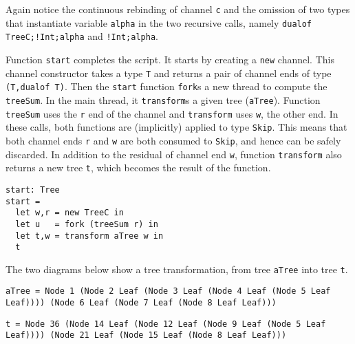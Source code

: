 Again notice the continuous rebinding of channel \lstinline|c| and the
omission of two types that instantiate variable \lstinline|alpha| in
the two recursive calls, namely \lstinline|dualof TreeC;!Int;alpha|
and \lstinline|!Int;alpha|.

Function \lstinline|start| completes the script. It starts by creating
a \lstinline|new| channel. This channel constructor takes a type
\lstinline|T| and returns a pair of channel ends of type
%
\lstinline|(T,dualof T)|. Then the \lstinline|start| function
\lstinline|fork|s a new thread to compute the \lstinline|treeSum|. In
the main thread, it \lstinline|transform|s a given tree
(\lstinline|aTree|). Function \lstinline|treeSum| uses the
\lstinline|r| end of the channel and \lstinline|transform| uses
\lstinline|w|, the other end. In these calls, both functions are
(implicitly) applied to type \lstinline|Skip|. This means that both
channel ends \lstinline|r| and \lstinline|w| are both consumed to
\lstinline|Skip|, and hence can be safely discarded. In addition to
the residual of channel end \lstinline|w|, function
\lstinline|transform| also returns a new tree \lstinline|t|, which
becomes the result of the function.
%
\begin{lstlisting}
start: Tree
start =
  let w,r = new TreeC in
  let u   = fork (treeSum r) in
  let t,w = transform aTree w in
  t
\end{lstlisting}

The two diagrams below show a tree transformation, from tree
\lstinline|aTree| into tree \lstinline|t|. 

\begin{lstlisting}
aTree = Node 1 (Node 2 Leaf (Node 3 Leaf (Node 4 Leaf (Node 5 Leaf Leaf)))) (Node 6 Leaf (Node 7 Leaf (Node 8 Leaf Leaf)))
\end{lstlisting}

\begin{lstlisting}
t = Node 36 (Node 14 Leaf (Node 12 Leaf (Node 9 Leaf (Node 5 Leaf Leaf)))) (Node 21 Leaf (Node 15 Leaf (Node 8 Leaf Leaf)))
\end{lstlisting}



